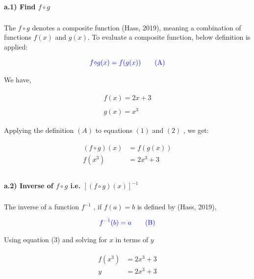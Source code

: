 \documentclass[a4paper]{report}
\begin{document}
\paragraph{a.1) Find $f{\circ}g$}

\subparagraph{}

The $f{\circ}g$ denotes a composite function (Hass, 2019), meaning a combination of functions $f(x)$ and $g(x)$. To evaluate a composite function, below definition is applied:

\begin{equation} 
    \color{blue} f{\circ}g (x)=f(g(x)) \tag{A}
\end{equation}

We have,

\begin{align}
\begin{split} \label{1}
 f(x) = 2x + 3   
\end{split}\\
\begin{split} \label{2}
    g(x) = x^3
\end{split}
\end{align}

Applying the definition $(A)$ to equations $(1)$ and $(2)$ , we get: 

\begin{align}
    \begin{split}
       (f{\circ}g)(x)& = f(g(x)) \\
      f(x^3) &= 2{x^3}+3 \\
    \end{split}
\end{align}


\paragraph{a.2) Inverse of $f{\circ}g$ i.e. $[{(f{\circ}g)(x)}]^{-1}$}

\subparagraph{}

The inverse of a function $f^{-1}$ , if $f(a)=b$ is defined by (Hass, 2019),

\begin{equation} 
    \color{blue} f^{-1}(b) = a \tag{B}
\end{equation}

Using equation (3) and solving for $x$ in terms of $y$

\begin{align*}
    \begin{split}
      f(x^3) &= 2{x^3}+3 \\
          y&=2{x^3}+3
    \end{split}
\end{align*}
\end{document}
